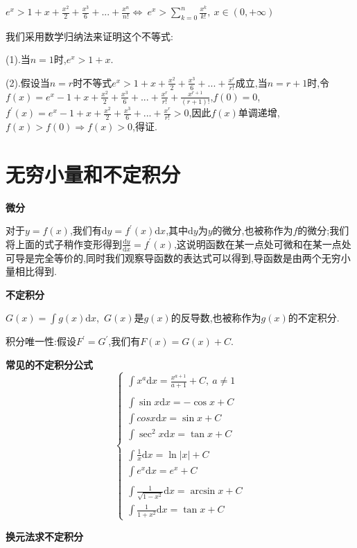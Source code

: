 \documentclass[oneside]{book}
\begin{document}
	$e^{x}>1+x+\frac{x^{2}}{2}+\frac{x^{3}}{6}+...+\frac{x^{n}}{n!}\Leftrightarrow \ e^{x}>\sum_{k=0}^{n}\frac{x^{k}}{k!},\ x\in (0,+\infty)$
	
	我们采用数学归纳法来证明这个不等式:
	
	(1).当$n=1$时,$e^{x}>1+x$.
	
	(2).假设当$n=r$时不等式$e^{x}>1+x+\frac{x^{2}}{2}+\frac{x^{3}}{6}+...+\frac{x^{r}}{r!}$成立,当$n=r+1$时,令$f(x)=e^{x}-1+x+\frac{x^{2}}{2}+\frac{x^{3}}{6}+...+\frac{x^{r}}{r!}+\frac{x^{r+1}}{(r+1)!}$,$f(0)=0$,$f^{'}(x)=e^{x}-1+x+\frac{x^{2}}{2}+\frac{x^{3}}{6}+...+\frac{x^{r}}{r!}>0$,因此$f(x)$单调递增,$f(x)>f(0)\Rightarrow f(x)>0$,得证.
	\chapter{无穷小量和不定积分}
	\textbf{微分}
	
	对于$y=f(x)$,我们有$\mathrm{d}y=f^{'}(x)\mathrm{d}x$,其中$\mathrm{d}y$为$y$的微分,也被称作为$f$的微分;我们将上面的式子稍作变形得到$\frac{\mathrm{d}y}{\mathrm{d}x}=f^{'}(x)$,这说明函数在某一点处可微和在某一点处可导是完全等价的,同时我们观察导函数的表达式可以得到,导函数是由两个无穷小量相比得到.
	
	\textbf{不定积分}
	
	$G(x)=\int g(x)\mathrm{d}x$,\ $G(x)$是$g(x)$的反导数,也被称作为$g(x)$的不定积分.
	
	积分唯一性:假设$F^{'}=G^{'}$,我们有$F(x)=G(x)+C$.
	
	\textbf{常见的不定积分公式}
	\begin{equation}
		\left\{\begin{array}{c}
		\int x^{a}\mathrm{d}x=\frac{x^{a+1}}{a+1}+C,\ a\neq 1\\\\\int \sin x\mathrm{d}x=-\cos x+C\\\int cos  x\mathrm{d}x=\sin x+C\\\int \sec^{2}x\mathrm{d}x=\tan x+C\\\\\int \frac{1}{x}\mathrm{d}x=\ln|x|+C\\\int e^{x}\mathrm{d}x=e^{x}+C\\\\\int \frac{1}{\sqrt{1-x^{2}}}\mathrm{d}x=\arcsin x+C\\\int \frac{1}{1+x^{2}}\mathrm{d}x=\tan x+C
	\end{array}\right.
	\end{equation}

	\textbf{换元法求不定积分}
	
\end{document}
